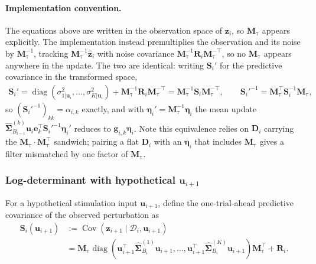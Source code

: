 \documentclass[11pt,letterpaper]{article} %
\begin{document}
\paragraph{Implementation convention.}
The equations above are written in the observation space of $\bm{z}_i$, so
$\bm{M}_{\mathrm{\tau}}$ appears explicitly. The implementation instead premultiplies the
observation and its noise by $\bm{M}_{\mathrm{\tau}}^{-1}$, tracking
$\bm{M}_{\mathrm{\tau}}^{-1}\hat{\bm{z}}_i$ with noise covariance
$\bm{M}_{\mathrm{\tau}}^{-1}\bm{R}_i\bm{M}_{\mathrm{\tau}}^{-\top}$, so no
$\bm{M}_{\mathrm{\tau}}$ appears anywhere in the update. The two are identical: writing
$\bm{S}_i'$ for the predictive covariance in the transformed space,
\begin{align*}
    \bm{S}_i'
    =
    \operatorname{diag}(\sigma^2_{1|\bm{u}_i},\dots,\sigma^2_{K|\bm{u}_i})
    + \bm{M}_{\mathrm{\tau}}^{-1}\bm{R}_i\bm{M}_{\mathrm{\tau}}^{-\top}
    =
    \bm{M}_{\mathrm{\tau}}^{-1}\bm{S}_i\bm{M}_{\mathrm{\tau}}^{-\top},
    \qquad
    \bm{S}_i'^{-1}
    =
    \bm{M}_{\mathrm{\tau}}^\top\bm{S}_i^{-1}\bm{M}_{\mathrm{\tau}},
\end{align*}
so $(\bm{S}_i'^{-1})_{kk} = \alpha_{i,k}$ exactly, and with
$\boldsymbol{\eta}_i' = \bm{M}_{\mathrm{\tau}}^{-1}\boldsymbol{\eta}_i$ the mean update
$\hat{\bm{\Sigma}}_{B_{i-1}}^{(k)}\bm{u}_i\bm{e}_k^\top\bm{S}_i'^{-1}\boldsymbol{\eta}_i'$
reduces to $\bm{g}_{i,k}\boldsymbol{\eta}_i$. Note this equivalence relies on $\bm{D}_i$
carrying the $\bm{M}_{\mathrm{\tau}}\cdot\bm{M}_{\mathrm{\tau}}^\top$ sandwich; pairing a flat
$\bm{D}_i$ with an $\boldsymbol{\eta}_i$ that includes $\bm{M}_{\mathrm{\tau}}$ gives a filter
mismatched by one factor of $\bm{M}_{\mathrm{\tau}}$.

\clearpage
\subsubsection*{Log-determinant with hypothetical $\bm{u}_{i+1}$}
For a hypothetical stimulation input $\bm{u}_{i+1}$, define the
one-trial-ahead predictive covariance of the observed perturbation as
\begin{align*}
    \bm{S}_i(\bm{u}_{i+1})
    &:=
    \operatorname{Cov}
    \left(
        \bm{z}_{i+1}
        \mid
        \mathcal{D}_i,\bm{u}_{i+1}
    \right) \\
    &=
    \bm{M}_{\mathrm{\tau}}
    \operatorname{diag}
    \left(
        \bm{u}_{i+1}^\top
        \hat{\bm{\Sigma}}_{B_i}^{(1)}
        \bm{u}_{i+1},
        \dots,
        \bm{u}_{i+1}^\top
        \hat{\bm{\Sigma}}_{B_i}^{(K)}
        \bm{u}_{i+1}
    \right)
    \bm{M}_{\mathrm{\tau}}^\top
    +
    \bm{R}_i.
\end{align*}
\end{document}
